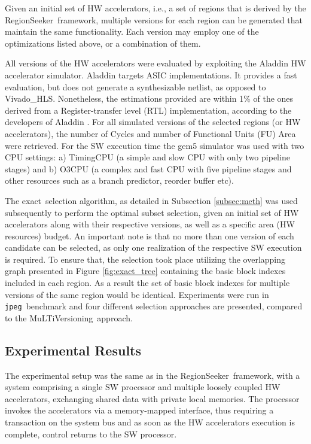 \documentclass[]{usiinfthesis}
\newcommand{\rseeker}{{RegionSeeker}}
\newcommand{\multi}{MuLTiVersioning}
\newcommand{\plms}{{private local memories}}
\newcommand{\exact}{\textsf{exact}}
\newcommand{\jpeg}{\texttt{jpeg}}
\begin{document}
Given an initial set of HW accelerators, i.e., a set of regions that is derived by the \rseeker\ framework, 
multiple versions for each region can be generated that maintain the same functionality.
Each version may employ one of the optimizations listed above, or a combination of them.
\par


All versions of the HW accelerators were evaluated by exploiting the Aladdin HW accelerator simulator.  
Aladdin targets ASIC implementations. It
provides a fast evaluation, but does not generate a synthesizable netlist,
as opposed to Vivado\_HLS. Nonetheless, the estimations provided are
within 1\% of the ones derived from a Register-transfer level (RTL) implementation, according to 
the developers of Aladdin \cite{ShaoJul14}.
For all simulated versions of the selected regions (or HW accelerators), the number of Cycles and number 
of Functional Units (FU) Area were retrieved. For the SW execution time the gem5 simulator 
\cite{BinkertFeb11}
was used with two CPU settings: a) TimingCPU  (a simple and slow CPU with only two pipeline stages)
and b) O3CPU (a complex and fast CPU with five pipeline stages and other resources such as a 
branch predictor, reorder buffer etc). \par


The \exact\ selection algorithm, as detailed in Subsection \ref{subsec:meth}  was used subsequently to 
perform the optimal subset selection, 
given an initial set of HW accelerators along with their respective versions, as well as a specific 
area (HW resources) budget. An important note is that no more than one version of each candidate 
can be selected, as only one realization of the respective SW execution is required.
To ensure that, the selection took place utilizing the overlapping graph presented in Figure \ref{fig:exact_tree} 
containing the basic block indexes included in each region. As a result the set of basic block indexes for 
multiple versions of the same region would be identical.
Experiments were run in \jpeg\ benchmark and four different selection
approaches are presented, compared to the \multi\ approach.\par

\subsection{Experimental Results}
\label{subsec:mv_res}

The experimental setup was the same as in the \rseeker\ framework, with a system comprising a single 
SW processor and multiple loosely coupled HW accelerators, exchanging shared data with \plms.
The processor invokes the accelerators via a memory-mapped
interface, thus requiring a transaction on the system bus and as soon as the HW accelerators execution is complete,
control returns to the SW processor.\par
\end{document}
